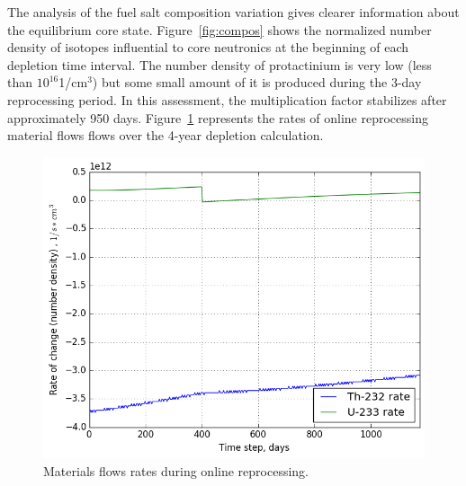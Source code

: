 \documentclass{anstrans}
\begin{document}
The analysis of the fuel salt composition variation gives clearer information 
about the equilibrium core state. Figure~\ref{fig:compos} shows the normalized 
number density of isotopes influential to core 
neutronics at the beginning of each depletion time interval. The number density 
of protactinium is very low (less than $10^{16}$1/cm$^3$) but some small amount 
of it is produced during the 3-day reprocessing period. In this assessment, the multiplication 
factor stabilizes after approximately 950 days. 
Figure~\ref{fig:rates} represents the rates of online reprocessing material flows
flows over the 4-year depletion calculation. 
\begin{figure}[htbp!] %
        \centering
        \includegraphics[width=1.03\linewidth]{rates_fuel.png}
        \caption{Materials flows rates during online reprocessing.}
        \label{fig:rates}
\end{figure}
\end{document}

